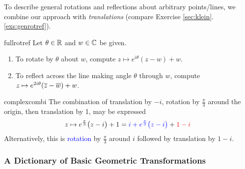 To describe general rotations and reflections about arbitrary points/lines, we combine our approach with \emph{translations} (compare Exercise \ref*{sec:klein}.\ref{exs:genrotref}).


\begin{cor}{}{fullrotref}
	Let $\theta\in\mathbb{R}$ and $w\in\mathbb{C}$ be given.
	\begin{enumerate}
	  \item To rotate by $\theta$ about $w$, compute $z\mapsto e^{i\theta}(z-w)+w$.
	  \item To reflect across the line making angle $\theta$ through $w$, compute $z\mapsto e^{2i\theta}(\overline{z}-\overline{w})+w$.
	\end{enumerate}
\end{cor}

\begin{example}{}{complexcombi}
	The combination of translation by $-i$, rotation by $\frac\pi 3$ around the origin, then translation by 1, may be expressed
	\[
		z\mapsto e^{\frac\pi 3}\bigl(z-i\bigr)+1=\textcolor{blue}{i+e^{\frac\pi 3}\bigl(z-i\bigr)}+\textcolor{red}{1-i}
	\]
	Alternatively, this is \textcolor{blue}{rotation} by $\frac\pi 3$ around $i$ followed by \textcolor{mRed}{translation} by $1-i$.
\end{example}


\pagebreak[3]


\subsubsection*{A Dictionary of Basic Geometric Transformations}


